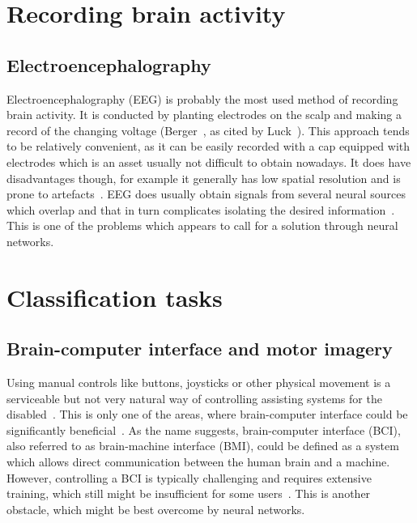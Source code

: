 \documentclass[eng,BP]{thesiskiv}
\begin{document}
\section{Recording brain activity}

\subsection{Electroencephalography}

Electroencephalography (EEG) is probably the most used method of recording brain activity. It is conducted by planting electrodes on the scalp and making a record of the changing voltage (Berger~\cite{berger:eeg:29}, as cited by Luck~\cite{luck:erp:book}). This approach tends to be relatively convenient, as it can be easily recorded with a cap equipped with electrodes which is an asset usually not difficult to obtain nowadays.
It does have disadvantages though, for example it generally has low spatial resolution and is prone to artefacts~\cite{berezutskaya:ieeg:22}. EEG does usually obtain signals from several neural sources which overlap and that in turn complicates isolating the desired information~\cite{luck:erp:book}. This is one of the problems which appears to call for a solution through neural networks.


\section{Classification tasks}

\subsection{Brain-computer interface and motor imagery}

Using manual controls like buttons, joysticks or other physical movement is a serviceable but not very natural way of controlling assisting systems for the disabled~\cite{he:bci:legs:18}. This is only one of the areas, where brain-computer interface could be significantly beneficial~\cite{craik:dl:eeg:rev:19}.
As the name suggests, brain-computer interface (BCI), also referred to as brain-machine interface (BMI), could be defined as a system which allows direct communication between the human brain and a machine. However, controlling a BCI is typically challenging and requires extensive training, which still might be insufficient for some users~\cite{stieger:data:21}.
This is another obstacle, which might be best overcome by neural networks.
\end{document}
